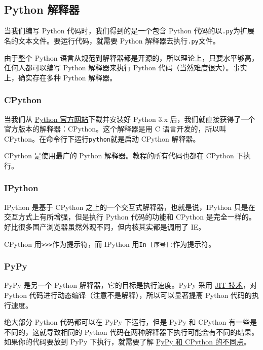 \hypertarget{python-ux89e3ux91caux5668}{%
\subsection{Python 解释器}\label{python-ux89e3ux91caux5668}}

当我们编写 Python 代码时，我们得到的是一个包含 Python
代码的以\texttt{.py}为扩展名的文本文件。要运行代码，就需要 Python
解释器去执行\texttt{.py}文件。

由于整个 Python
语言从规范到解释器都是开源的，所以理论上，只要水平够高，任何人都可以编写
Python 解释器来执行 Python 代码（当然难度很大）。事实上，确实存在多种
Python 解释器。

\hypertarget{cpython}{%
\subsubsection{CPython}\label{cpython}}

当我们从 \href{https://www.python.org/}{Python 官方网站}下载并安装好
Python 3.x
后，我们就直接获得了一个官方版本的解释器：CPython。这个解释器是用 C
语言开发的，所以叫 CPython。在命令行下运行\texttt{python}就是启动
CPython 解释器。

CPython 是使用最广的 Python 解释器。教程的所有代码也都在 CPython
下执行。

\hypertarget{ipython}{%
\subsubsection{IPython}\label{ipython}}

IPython 是基于 CPython 之上的一个交互式解释器，也就是说，IPython
只是在交互方式上有所增强，但是执行 Python 代码的功能和 CPython
是完全一样的。好比很多国产浏览器虽然外观不同，但内核其实都是调用了 IE。

CPython
用\texttt{\textgreater{}\textgreater{}\textgreater{}}作为提示符，而
IPython 用\texttt{In\ {[}序号{]}:}作为提示符。

\hypertarget{pypy}{%
\subsubsection{PyPy}\label{pypy}}

PyPy 是另一个 Python 解释器，它的目标是执行速度。PyPy 采用
\href{http://en.wikipedia.org/wiki/Just-in-time_compilation}{JIT
技术}，对 Python 代码进行动态编译（注意不是解释），所以可以显著提高
Python 代码的执行速度。

绝大部分 Python 代码都可以在 PyPy 下运行，但是 PyPy 和 CPython
有一些是不同的，这就导致相同的 Python
代码在两种解释器下执行可能会有不同的结果。如果你的代码要放到 PyPy
下执行，就需要了解
\href{http://pypy.readthedocs.org/en/latest/cpython_differences.html}{PyPy
和 CPython 的不同点}。

